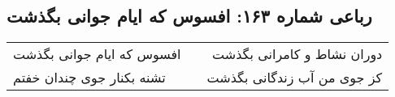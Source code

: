 \begin{center}
\section*{رباعی شماره ۱۶۳: افسوس که ایام جوانی بگذشت}
\label{sec:sh163}
\begin{longtable}{l p{0.5cm} r}
افسوس که ایام جوانی بگذشت
&&
دوران نشاط و کامرانی بگذشت
\\
تشنه بکنار جوی چندان خفتم
&&
کز جوی من آب زندگانی بگذشت
\\
\end{longtable}
\end{center}
